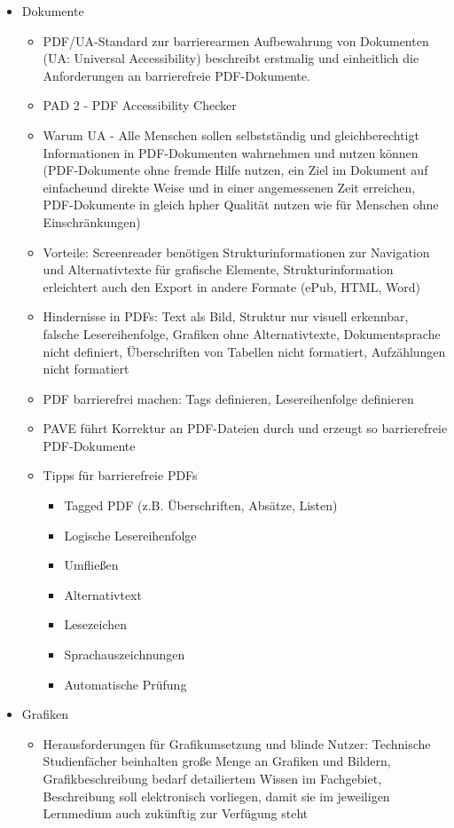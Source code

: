 \documentclass[paper=a4, fontsize=11pt]{scrartcl} %
\numberwithin{equation}{section} %
\numberwithin{figure}{section} %
\numberwithin{table}{section} %
\begin{document}
\begin{itemize}
\item Dokumente
\begin{itemize}
\item PDF/UA-Standard zur barrierearmen Aufbewahrung von Dokumenten (UA: Universal Accessibility) beschreibt erstmalig und einheitlich die Anforderungen an barrierefreie PDF-Dokumente.
\item PAD 2 - PDF Accessibility Checker
\item Warum UA - Alle Menschen sollen selbstständig und gleichberechtigt Informationen in PDF-Dokumenten wahrnehmen und nutzen können (PDF-Dokumente ohne fremde Hilfe nutzen, ein Ziel im Dokument auf einfacheund direkte Weise und in einer angemessenen Zeit erreichen, PDF-Dokumente in gleich hpher Qualität nutzen wie für Menschen ohne Einschränkungen)
\item Vorteile: Screenreader benötigen Strukturinformationen zur Navigation und Alternativtexte für grafische Elemente, Strukturinformation erleichtert auch den Export in andere Formate (ePub, HTML, Word)
\item Hindernisse in PDFs: Text als Bild, Struktur nur visuell erkennbar, falsche Lesereihenfolge, Grafiken ohne Alternativtexte, Dokumentsprache nicht definiert, Überschriften von Tabellen nicht formatiert, Aufzählungen nicht formatiert
\item PDF barrierefrei machen: Tags definieren, Lesereihenfolge definieren
\item PAVE führt Korrektur an PDF-Dateien durch und erzeugt so barrierefreie PDF-Dokumente
\item Tipps für barrierefreie PDFs
\begin{itemize}
\item Tagged PDF (z.B. Überschriften, Absätze, Listen)
\item Logische Lesereihenfolge
\item Umfließen
\item Alternativtext
\item Lesezeichen
\item Sprachauszeichnungen
\item Automatische Prüfung
\end{itemize}
\end{itemize}
\item Grafiken
\begin{itemize}
\item Herausforderungen für Grafikumsetzung und blinde Nutzer: Technische Studienfächer beinhalten große Menge an Grafiken und Bildern, Grafikbeschreibung bedarf detailiertem Wissen im Fachgebiet, Beschreibung soll elektronisch vorliegen, damit sie im jeweiligen Lernmedium auch zukünftig zur Verfügung steht

\end{itemize}
\end{itemize}
\end{document}
